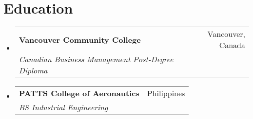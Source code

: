 \documentclass[letterpaper,11pt]{article}
\makeatletter
\newcommand{\resumeSubheading}[4]{
\vspace{-2pt}\item
\begin{tabular*}{0.97\textwidth}[t]{l@{\extracolsep{\fill}}r}
\textbf{#1} & #2 \\
\textit{\small#3} & \textit{\small #4} \\
\end{tabular*}\vspace{-7pt}
}
\newcommand{\resumeSubHeadingListStart}{\begin{itemize}[leftmargin=0.15in, label={}]}
\newcommand{\resumeSubHeadingListEnd}{\end{itemize}}
\makeatother
\begin{document}
\section{Education}
\resumeSubHeadingListStart
\resumeSubheading{Vancouver Community College}{Vancouver, Canada}{Canadian Business Management Post-Degree Diploma}{}
\resumeSubheading{PATTS College of Aeronautics}{Philippines}{BS Industrial Engineering}{}
\resumeSubHeadingListEnd

\end{document}
